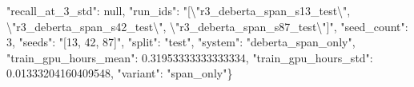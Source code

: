 "recall\_at\_3\_std": null, "run\_ids": "[\textbackslash{}"r3\_deberta\_span\_s13\_test\textbackslash{}", \textbackslash{}"r3\_deberta\_span\_s42\_test\textbackslash{}", \textbackslash{}"r3\_deberta\_span\_s87\_test\textbackslash{}"]", "seed\_count": 3, "seeds": "[13, 42, 87]", "split": "test", "system": "deberta\_span\_only", "train\_gpu\_hours\_mean": 0.31953333333333334, "train\_gpu\_hours\_std": 0.01333204160409548, "variant": "span\_only"\}
